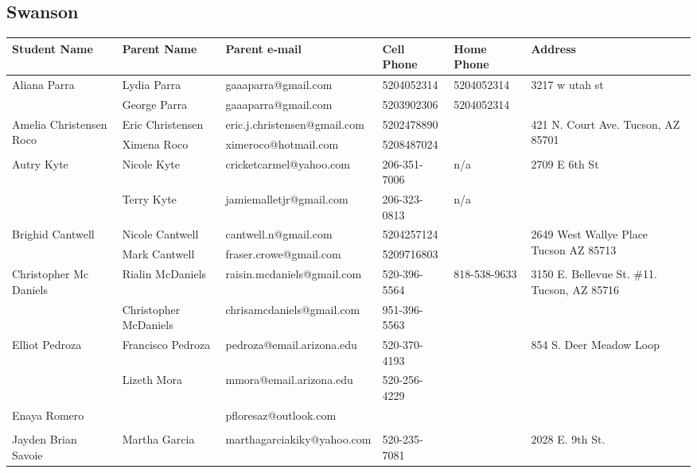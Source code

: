 \documentclass[landscape]{article}\usepackage[]{graphicx}\usepackage[]{color}
\begin{document}
\subsection{Swanson}
\begin{longtable}{|p{100pt}|p{100pt}|p{140pt}|p{60pt}|p{64pt}|p{120pt}|}
\textbf{Student Name} & \textbf{Parent Name} & \textbf{Parent e-mail} & \textbf{Cell Phone} & \textbf{Home Phone} & \textbf{Address}\\
\hline
\hline
\multirow{2}{100pt}{Aliana Parra} & Lydia Parra & gaaaparra@gmail.com & 5204052314 & 5204052314 & \multirow{2}{120pt}{3217 w utah st} \\
 & George Parra & gaaaparra@gmail.com & 5203902306 & 5204052314 & \\
\hline
\multirow{2}{100pt}{Amelia Christensen Roco} & Eric Christensen & eric.j.christensen@gmail.com & 5202478890 &  & \multirow{2}{120pt}{421 N. Court Ave. Tucson, AZ 85701} \\
 & Ximena Roco & ximeroco@hotmail.com & 5208487024 &  & \\
\hline
\multirow{2}{100pt}{Autry Kyte} & Nicole Kyte & cricketcarmel@yahoo.com & 206-351-7006 & n/a & \multirow{2}{120pt}{2709 E 6th St} \\
 & Terry Kyte & jamiemalletjr@gmail.com & 206-323-0813 & n/a & \\
\hline
\multirow{2}{100pt}{Brighid Cantwell} & Nicole Cantwell & cantwell.n@gmail.com & 5204257124 &  & \multirow{2}{120pt}{2649 West Wallye Place Tucson AZ 85713} \\
 & Mark Cantwell & fraser.crowe@gmail.com & 5209716803 &  & \\
\hline
\multirow{2}{100pt}{Christopher Mc Daniels} & Rialin McDaniels & raisin.mcdaniels@gmail.com & 520-396-5564 & 818-538-9633 & \multirow{2}{120pt}{3150 E. Bellevue St. \#11. Tucson, AZ 85716} \\
 & Christopher McDaniels & chrisamcdaniels@gmail.com & 951-396-5563 &  & \\
\hline
\multirow{2}{100pt}{Elliot Pedroza} & Francisco Pedroza & pedroza@email.arizona.edu & 520-370-4193 &  & \multirow{2}{120pt}{854 S. Deer Meadow Loop} \\
 & Lizeth Mora & mmora@email.arizona.edu & 520-256-4229 &  & \\
\hline
\multirow{2}{100pt}{Enaya Romero} &  & pfloresaz@outlook.com &  &  & \multirow{2}{120pt}{} \\
 &  &  &  &  & \\
\hline
\multirow{2}{100pt}{Jayden Brian Savoie} & Martha Garcia & marthagarciakiky@yahoo.com & 520-235-7081 &  & \multirow{2}{120pt}{2028 E. 9th St.} \\

\end{longtable}
\end{document}
